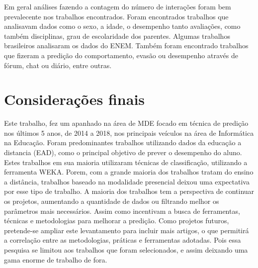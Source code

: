 \documentclass[ti]{texufpel} %
\begin{document}
Em geral análises fazendo a contagem do número de interações foram bem prevalecente nos trabalhos encontrados. Foram encontrados trabalhos que analisavam dados como o sexo, a idade, o desempenho tanto avaliações, como também disciplinas, grau de escolaridade dos parentes. Algumas trabalhos brasileiros analisaram os dados do ENEM. Também foram encontrado trabalhos que fizeram a predição do comportamento, evasão ou desempenho através de fórum, chat ou diário, entre outras.

\chapter{Considerações finais}

Este trabalho, fez um apanhado na área de MDE focado em técnica de predição nos últimos 5 anos, de 2014 a 2018, nos principais veículos na área de Informática na Educação. Foram predominantes trabalhos utilizando dados da educação a distancia (EAD), como o principal objetivo de prever o desempenho do aluno. Estes trabalhos em sua maioria utilizaram técnicas de classificação, utilizando a ferramenta WEKA. Porem, com a grande maioria dos trabalhos tratam do ensino a distância, trabalhos baseado na modalidade presencial deixou uma expectativa por esse tipo de trabalho.
A maioria dos trabalhos tem a perspectiva de continuar os projetos, aumentando a quantidade de dados ou filtrando melhor os parâmetros mais necessários. Assim como incentivam a busca de ferramentas, técnicas e metodologias para melhorar a predição.
Como projetos futuros, pretende-se ampliar este levantamento para incluir mais artigos, o que permitirá a correlação entre as metodologias, práticas e ferramentas adotadas. Pois essa pesquisa se limitou aos trabalhos que foram selecionados, e assim deixando uma gama enorme de trabalho de fora.




\end{document}
